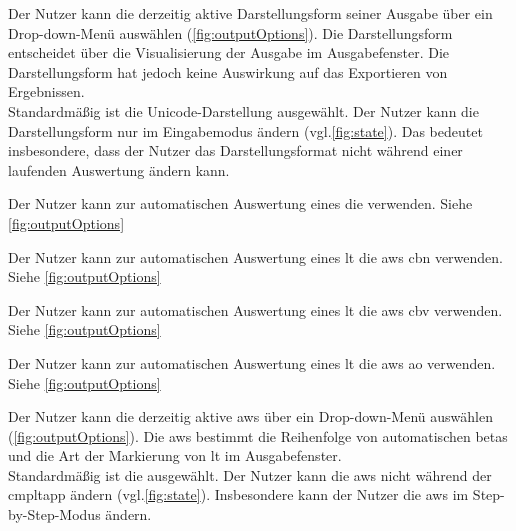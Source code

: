 \documentclass[parskip=full,11pt,twoside]{scrartcl}
\begin{document}
Der Nutzer kann die derzeitig aktive Darstellungsform seiner Ausgabe über ein Drop-down-Menü auswählen (\cref{fig:outputOptions}).
Die Darstellungsform entscheidet über die Visualisierung der Ausgabe im Ausgabefenster. Die Darstellungsform hat jedoch keine Auswirkung auf das Exportieren von Ergebnissen.\\
Standardmäßig ist die Unicode-Darstellung ausgewählt.
Der Nutzer kann die Darstellungsform nur im Eingabemodus ändern (vgl.\cref{fig:state}).
Das bedeutet insbesondere, dass der Nutzer das Darstellungsformat nicht während einer laufenden Auswertung ändern kann.

Der Nutzer kann zur automatischen Auswertung eines  die  verwenden. Siehe \cref{fig:outputOptions}

Der Nutzer kann zur automatischen Auswertung eines \gls{lt} die \gls{aws} \gls{cbn} verwenden. Siehe \cref{fig:outputOptions}

Der Nutzer kann zur automatischen Auswertung eines \gls{lt} die \gls{aws} \gls{cbv} verwenden. Siehe \cref{fig:outputOptions}

Der Nutzer kann zur automatischen Auswertung eines \gls{lt} die \gls{aws} \gls{ao} verwenden. Siehe \cref{fig:outputOptions}

Der Nutzer kann die derzeitig aktive \gls{aws} über ein Drop-down-Menü auswählen (\cref{fig:outputOptions}). 
Die \gls{aws} bestimmt die Reihenfolge von automatischen \glspl{beta} und die Art der Markierung von \gls{lt} im Ausgabefenster.\\
Standardmäßig ist die  ausgewählt. 
Der Nutzer kann die \gls{aws} nicht während der \gls{cmpltapp} ändern (vgl.\cref{fig:state}). 
Insbesondere kann der Nutzer die \gls{aws} im Step-by-Step-Modus ändern.
\end{document}
